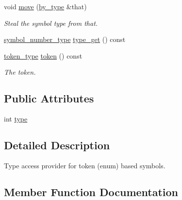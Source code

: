 \begin{DoxyCompactItemize}
void \hyperlink{structyy_1_1parser_1_1by__type_a68911dec3423e0748fd56f369d1b5d10}{move} (\hyperlink{structyy_1_1parser_1_1by__type}{by\+\_\+type} \&that)
\begin{DoxyCompactList}\small\item\em Steal the symbol type from {\itshape that}. \end{DoxyCompactList}\item 
\hyperlink{classyy_1_1parser_a522f5c6c3481d9285b0b991ac12292eb}{symbol\+\_\+number\+\_\+type} \hyperlink{structyy_1_1parser_1_1by__type_afacae75461e4c6254bf2539b26494b72}{type\+\_\+get} () const
\item 
\mbox{\label{structyy_1_1parser_1_1by__type_a1d5e39a21d584073aa04651a823d58f2}} 
\hyperlink{classyy_1_1parser_ac1ba3f834abfa251ea746c4ca8da5a85}{token\+\_\+type} \hyperlink{structyy_1_1parser_1_1by__type_a1d5e39a21d584073aa04651a823d58f2}{token} () const
\begin{DoxyCompactList}\small\item\em The token. \end{DoxyCompactList}\end{DoxyCompactItemize}
\subsection*{Public Attributes}
\begin{DoxyCompactItemize}
\item 
int \hyperlink{structyy_1_1parser_1_1by__type_ae935bfe082da55acbfb798b2527e70d3}{type}
\end{DoxyCompactItemize}


\subsection{Detailed Description}
Type access provider for token (enum) based symbols. 

\subsection{Member Function Documentation}
\mbox{\label{structyy_1_1parser_1_1by__type_afacae75461e4c6254bf2539b26494b72}} 
